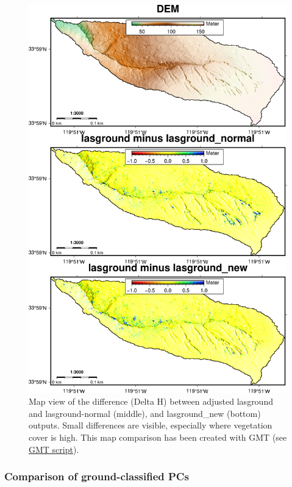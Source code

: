 \documentclass[a4paperpaper,,tablecaptionabove]{scrartcl}
\begin{document}
\begin{figure}
\centering
\includegraphics[width=\textwidth,height=0.9\textheight]{./tex2pdf.-e6884bf2dada0f3b/66cee76fec3bc8d450003947c982939572449c91.png}
\caption{Map view of the difference (Delta H) between adjusted lasground
and lasground-normal (middle), and lasground\_new (bottom) outputs.
Small differences are visible, especially where vegetation cover is
high. This map comparison has been created with GMT (see
\href{https://github.com/BodoBookhagen/PC_geomorph_roughness/blob/master/example_01/example01_create_DEM_comparison_ground_classification_gmt.sh}{GMT
script}).\label{Fig:Cat16_lasground_diff}}
\end{figure}

\hypertarget{comparison-of-ground-classified-pcs}{%
\subsubsection{Comparison of ground-classified
PCs}\label{comparison-of-ground-classified-pcs}}
\end{document}

